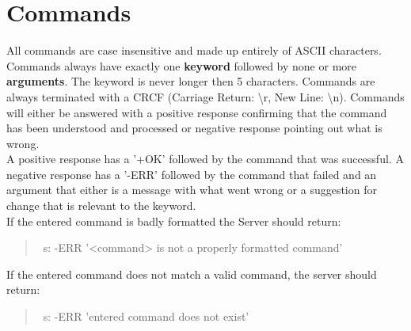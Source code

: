 \documentclass[a4paper,11pt]{article}
\begin{document}
\section{Commands}
All commands are case insensitive and made up entirely of ASCII characters. Commands always have exactly one \textbf{keyword} followed by none or more \textbf{arguments}. The keyword is never longer then 5 characters. Commands are always terminated with a CRCF (Carriage Return: \textbackslash r, New Line: \textbackslash n). Commands will either be answered with a positive response confirming that the command has been understood and processed or negative response pointing out what is wrong.\\
A positive response has a '+OK' followed by the command that was successful. A negative response has a '-ERR' followed by the command that failed and an argument that either is a message with what went wrong or a suggestion for change that is relevant to the keyword.\\
If the entered command is badly formatted the Server should return:
\begin{quote}\
  s: -ERR '<command> is not a properly formatted command'
\end{quote}
If the entered command does not match a valid command, the server should return:
\begin{quote}\
  s: -ERR 'entered command does not exist'
\end{quote}
\clearpage
\end{document}
